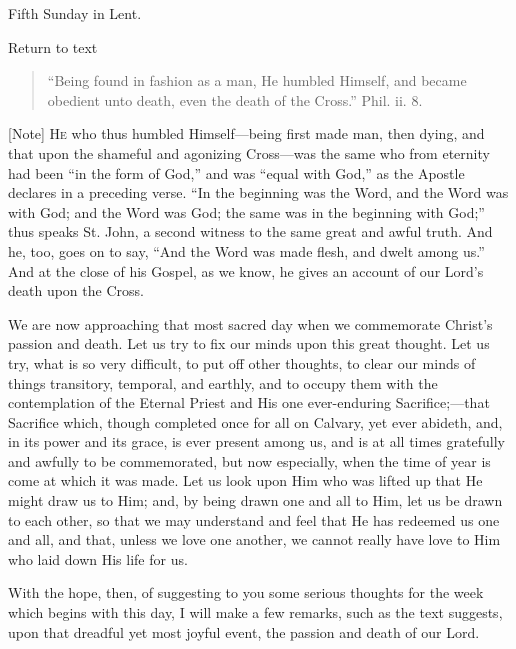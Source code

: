 
Fifth Sunday in Lent.

Return to text


\begin{quote}

``Being found in fashion as a man, He humbled Himself, and
became obedient unto death, even the death of the Cross.'' Phil.
ii. 8.

\end{quote}

[Note] H\textsc{e} who thus humbled Himself—being
first made man, then dying, and that upon the shameful and agonizing
Cross—was the same who from eternity had been ``in the form of
God,'' and was ``equal with God,'' as the Apostle declares
in a preceding verse. ``In the beginning was the Word, and the Word
was with God; and the Word was God; the same was in the beginning with
God;'' thus speaks St. John, a second witness to the same great and
awful truth. And he, too, goes on to say, ``And the Word was made
flesh, and dwelt among us.'' And at the close of his Gospel, as we
know, he gives an account of our Lord's death upon the Cross.

We are now approaching that most sacred day when we commemorate
Christ's passion and death. Let us try to fix our minds upon this great
thought. Let us try, what is so very difficult, to put off other
thoughts, to clear our minds of things transitory, temporal, and
earthly, and to occupy them with the contemplation of the Eternal Priest
and His one ever-enduring Sacrifice;—that Sacrifice which, though
completed once for all on Calvary, yet ever abideth, and, in its power
and its grace, is ever present among us, and is at all times gratefully
and awfully to be commemorated, but now especially, when the time of
year is come at which it was made. Let us look upon Him who was lifted
up that He might draw us to Him; and, by being drawn one and all to Him,
let us be drawn to each other, so that we may understand and feel that
He has redeemed us one and all, and that, unless we love one another, we
cannot really have love to Him who laid down His life for us.

With the hope, then, of suggesting to you some serious thoughts for
the week which begins with this day, I will make a few remarks, such as
the text suggests, upon that dreadful yet most joyful event, the passion
and death of our Lord.


